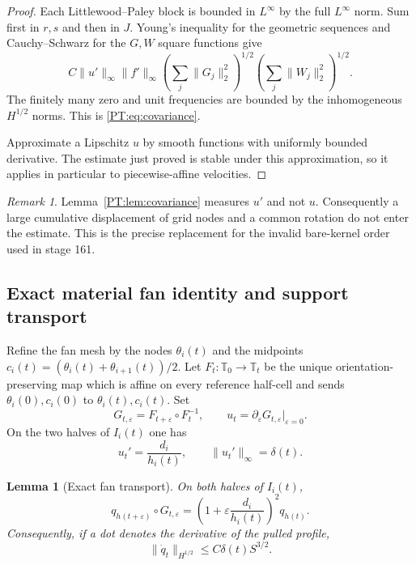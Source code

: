 \documentclass[11pt]{amsart}
\numberwithin{equation}{section}
\newtheorem{lemma}[theorem]{Lemma}
\theoremstyle{definition}
\theoremstyle{remark}
\newtheorem{remark}[theorem]{Remark}
\newcommand{\T}{\mathbb T}
\begin{document}
\begin{proof}
Each Littlewood--Paley block is bounded in $L^\infty$ by the full
$L^\infty$ norm.  Sum first in $r,s$ and then in $J$.  Young's inequality
for the geometric sequences and Cauchy--Schwarz for the $G,W$ square
functions give
\[
 C\|u'\|_\infty\|f'\|_\infty
 \left(\sum_j\|G_j\|_2^2\right)^{1/2}
 \left(\sum_j\|W_j\|_2^2\right)^{1/2}.
\]
The finitely many zero and unit frequencies are bounded by the
inhomogeneous $H^{1/2}$ norms.  This is \eqref{PT:eq:covariance}.

Approximate a Lipschitz $u$ by smooth functions with uniformly bounded
derivative.  The estimate just proved is stable under this approximation,
so it applies in particular to piecewise-affine velocities.
\end{proof}

\begin{remark}
Lemma~\ref{PT:lem:covariance} measures $u'$ and not $u$.  Consequently a
large cumulative displacement of grid nodes and a common rotation do not
enter the estimate.  This is the precise replacement for the invalid
bare-kernel order used in stage 161.
\end{remark}

\subsection{Exact material fan identity and support transport}

Refine the fan mesh by the nodes $\theta_i(t)$ and the midpoints
$c_i(t)=(\theta_i(t)+\theta_{i+1}(t))/2$.  Let
$F_t:\T_0\to\T_t$ be the unique orientation-preserving map which is
affine on every reference half-cell and sends
\(\theta_i(0),c_i(0)\) to \(\theta_i(t),c_i(t)\).  Set
\begin{equation}\label{PT:eq:finite-material-map}
 G_{t,\varepsilon}=F_{t+\varepsilon}\circ F_t^{-1},
 \qquad
 u_t=\partial_\varepsilon G_{t,\varepsilon}\big|_{\varepsilon=0}.
\end{equation}
On the two halves of $I_i(t)$ one has
\begin{equation}\label{PT:eq:uprime}
 u_t'=\frac{d_i}{h_i(t)},
 \qquad \|u_t'\|_\infty=\delta(t).
\end{equation}

\begin{lemma}[Exact fan transport]\label{PT:lem:q-transport}
On both halves of $I_i(t)$,
\begin{equation}\label{PT:eq:q-transport}
 q_{h(t+\varepsilon)}\circ G_{t,\varepsilon}
 =\left(1+\varepsilon\frac{d_i}{h_i(t)}\right)^2q_{h(t)}.
\end{equation}
Consequently, if a dot denotes the derivative of the pulled profile,
\begin{equation}\label{PT:eq:qdot}
 \|\dot q_t\|_{H^{1/2}}
 \le C\delta(t)S^{3/2}.
\end{equation}
\end{lemma}
\end{document}
